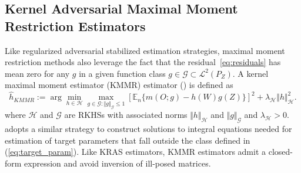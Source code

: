 \documentclass[twoside,11pt]{article}
\newcommand{\E}{\mathbb{E}}
\newcommand{\mc}{\mathcal}
\begin{document}
\subsection{Kernel Adversarial Maximal Moment Restriction Estimators}\label{sec:compare_mmr}

Like regularized adversarial stabilized estimation strategies, maximal moment restriction methods also leverage the fact that the residual~\eqref{eq:residuals} has mean zero for any $g$ in a given function class $g\in\mc{G}\subset\mc{L}^2(P_Z)$. 
A kernel maximal moment estimator (KMMR) estimator (\citet{muandet2020kernel, mastouri2021proximal}) is defined as 
\[
\hat h_{KMMR}:=\arg\min_{h\in\mc{H}}\max_{g\in\mc{G}: \Vert g \Vert_{\mc{G}}\le1}\left[\E_n\{m(O;g)-h(W)g(Z)\}\right]^2+\lambda_\mc{H}\Vert h\Vert_{\mc{H}}^2.
\]
where $\mc{H}$ and $\mc{G}$ are RKHSs with associated norms $\Vert h\Vert_{\mc{H}}$  and  $\Vert g \Vert_{\mc{G}}$ and $\lambda_\mc{H}>0$. \cite{park2024proximal} adopts a similar strategy to construct solutions to integral equations needed for estimation of target parameters that fall outside the class defined in (\ref{eq:target_param}). Like KRAS estimators, KMMR estimators admit a closed-form expression and avoid inversion of ill-posed matrices.
\end{document}
